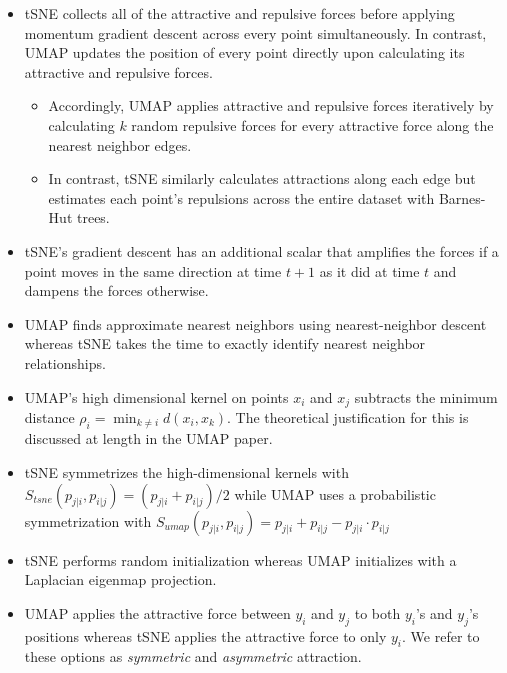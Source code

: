 \documentclass{article}
\theoremstyle{definition}
\begin{document}
\begin{itemize}
    \item tSNE collects all of the attractive and repulsive forces before applying momentum gradient descent across every point simultaneously. In contrast,
        UMAP updates the position of every point directly upon calculating its attractive and repulsive forces.
    \begin{itemize}
        \item Accordingly, UMAP applies attractive and repulsive forces iteratively by calculating $k$ random repulsive forces for every attractive force along the
            nearest neighbor edges.
        \item In contrast, tSNE similarly calculates attractions along each edge but estimates each point's repulsions across the entire dataset with Barnes-Hut
            trees.
    \end{itemize}

    \item tSNE's gradient descent has an additional scalar that amplifies the forces if a point moves in the same direction at time $t+1$ as it did at time $t$
        and dampens the forces otherwise.

    \item UMAP finds approximate nearest neighbors using nearest-neighbor descent whereas tSNE takes the time to exactly identify nearest neighbor relationships.

    \item UMAP's high dimensional kernel on points $x_i$ and $x_j$ subtracts the minimum distance $\rho_i = \min_{k \neq i} d(x_i, x_k)$. The theoretical
        justification for this is discussed at length in the UMAP paper. 

    \item tSNE symmetrizes the high-dimensional kernels with $S_{tsne}(p_{j|i}, p_{i|j}) = (p_{j|i} + p_{i|j}) / 2$ while UMAP uses a probabilistic
        symmetrization with $S_{umap}(p_{j|i}, p_{i|j}) = p_{j|i} + p_{i|j} - p_{j|i} \cdot p_{i|j}$

    \item tSNE performs random initialization whereas UMAP initializes with a Laplacian eigenmap projection.

    \item UMAP applies the attractive force between $y_i$ and $y_j$ to both $y_i$'s and $y_j$'s positions whereas tSNE applies the attractive force to only $y_i$.
        We refer to these options as \textit{symmetric} and \textit{asymmetric} attraction.
\end{itemize}
\end{document}
